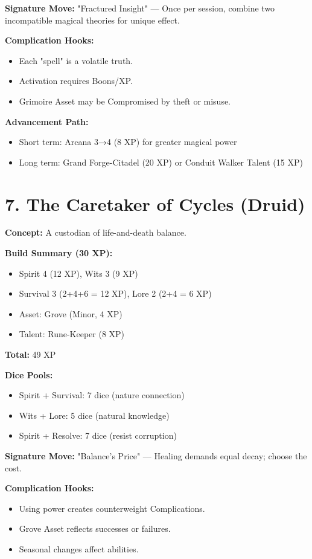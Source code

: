\begin{itemize}
\textbf{Signature Move:} "Fractured Insight" — Once per session, combine two incompatible magical theories for unique effect.

\textbf{Complication Hooks:}
\begin{itemize}
  \item Each "spell" is a volatile truth.
  \item Activation requires Boons/XP.
  \item Grimoire Asset may be Compromised by theft or misuse.
\end{itemize}

\textbf{Advancement Path:}
\begin{itemize}
  \item Short term: Arcana 3→4 (8 XP) for greater magical power
  \item Long term: Grand Forge-Citadel (20 XP) or Conduit Walker Talent (15 XP)
\end{itemize}

\section{7. The Caretaker of Cycles (Druid)}

\textbf{Concept:} A custodian of life-and-death balance.

\textbf{Build Summary (30 XP):}
\begin{itemize}
  \item Spirit 4 (12 XP), Wits 3 (9 XP)
  \item Survival 3 (2+4+6 = 12 XP), Lore 2 (2+4 = 6 XP)
  \item Asset: Grove (Minor, 4 XP)
  \item Talent: Rune-Keeper (8 XP)
\end{itemize}
\textbf{Total:} 49 XP

\textbf{Dice Pools:}
\begin{itemize}
  \item Spirit + Survival: 7 dice (nature connection)
  \item Wits + Lore: 5 dice (natural knowledge)
  \item Spirit + Resolve: 7 dice (resist corruption)
\end{itemize}

\textbf{Signature Move:} "Balance's Price" — Healing demands equal decay; choose the cost.

\textbf{Complication Hooks:}
\begin{itemize}
  \item Using power creates counterweight Complications.
  \item Grove Asset reflects successes or failures.
  \item Seasonal changes affect abilities.
\end{itemize}


\end{itemize}

